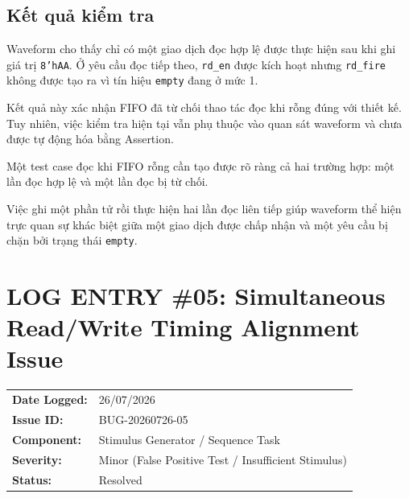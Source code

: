 \documentclass[12pt, a4paper]{article}
\begin{document}
\subsection*{Kết quả kiểm tra}

Waveform cho thấy chỉ có một giao dịch đọc hợp lệ được thực hiện sau khi ghi giá trị \texttt{8'hAA}. Ở yêu cầu đọc tiếp theo, \texttt{rd\_en} được kích hoạt nhưng \texttt{rd\_fire} không được tạo ra vì tín hiệu \texttt{empty} đang ở mức 1.

Kết quả này xác nhận FIFO đã từ chối thao tác đọc khi rỗng đúng với thiết kế. Tuy nhiên, việc kiểm tra hiện tại vẫn phụ thuộc vào quan sát waveform và chưa được tự động hóa bằng Assertion.

\begin{tcolorbox}[colback=noteBlue!5!white, colframe=noteBlue, title=\textbf{Bài học kinh nghiệm}]
Một test case đọc khi FIFO rỗng cần tạo được rõ ràng cả hai trường hợp: một lần đọc hợp lệ và một lần đọc bị từ chối. 

Việc ghi một phần tử rồi thực hiện hai lần đọc liên tiếp giúp waveform thể hiện trực quan sự khác biệt giữa một giao dịch được chấp nhận và một yêu cầu bị chặn bởi trạng thái \texttt{empty}.
\end{tcolorbox}



\newpage

\section*{LOG ENTRY \#05: Simultaneous Read/Write Timing Alignment Issue}

\begin{tcolorbox}[
    colback=bugHeaderBg,
    colframe=mainTitle,
    arc=2pt,
    boxrule=1pt,
    title=\textbf{ISSUE METADATA \& TRACKING INFO}
]
\begin{tabular}{ll}
    \textbf{Date Logged:}   & 26/07/2026 \\
    \textbf{Issue ID:}      & BUG-20260726-05 \\
    \textbf{Component:}     & Stimulus Generator / Sequence Task \\
    \textbf{Severity:}      & Minor (False Positive Test / Insufficient Stimulus) \\
    \textbf{Status:}        & Resolved \\
\end{tabular}
\end{tcolorbox}
\end{document}
